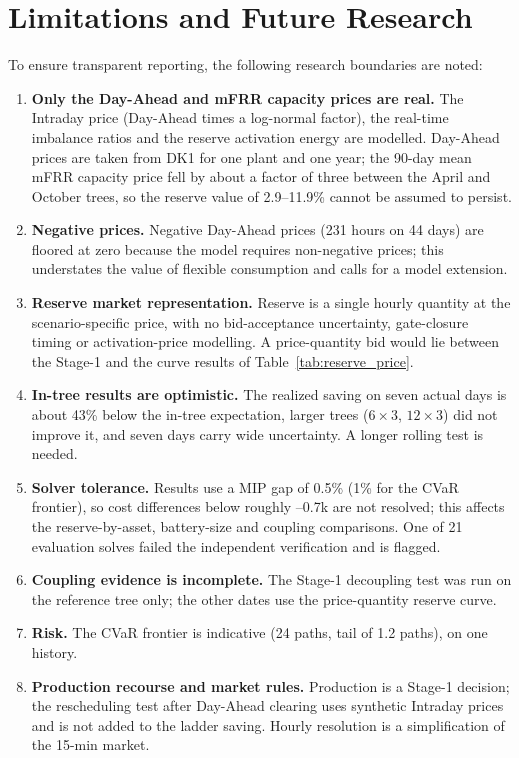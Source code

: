 \documentclass[journal]{IEEEtran}
\begin{document}
\section{Limitations and Future Research}
To ensure transparent reporting, the following research boundaries are noted:
\begin{enumerate}
    \item \textbf{Only the Day-Ahead and mFRR capacity prices are real.} The Intraday price (Day-Ahead times a log-normal factor), the real-time imbalance ratios and the reserve activation energy are modelled. Day-Ahead prices are taken from DK1 for one plant and one year; the 90-day mean mFRR capacity price fell by about a factor of three between the April and October trees, so the reserve value of 2.9--11.9\% cannot be assumed to persist.
    \item \textbf{Negative prices.} Negative Day-Ahead prices (231 hours on 44 days) are floored at zero because the model requires non-negative prices; this understates the value of flexible consumption and calls for a model extension.
    \item \textbf{Reserve market representation.} Reserve is a single hourly quantity at the scenario-specific price, with no bid-acceptance uncertainty, gate-closure timing or activation-price modelling. A price-quantity bid would lie between the Stage-1 and the curve results of Table~\ref{tab:reserve_price}.
    \item \textbf{In-tree results are optimistic.} The realized saving on seven actual days is about 43\% below the in-tree expectation, larger trees ($6\times3$, $12\times3$) did not improve it, and seven days carry wide uncertainty. A longer rolling test is needed.
    \item \textbf{Solver tolerance.} Results use a MIP gap of 0.5\% (1\% for the CVaR frontier), so cost differences below roughly --0.7k are not resolved; this affects the reserve-by-asset, battery-size and coupling comparisons. One of 21 evaluation solves failed the independent verification and is flagged.
    \item \textbf{Coupling evidence is incomplete.} The Stage-1 decoupling test was run on the reference tree only; the other dates use the price-quantity reserve curve.
    \item \textbf{Risk.} The CVaR frontier is indicative (24 paths, tail of 1.2 paths), on one history.
    \item \textbf{Production recourse and market rules.} Production is a Stage-1 decision; the rescheduling test after Day-Ahead clearing uses synthetic Intraday prices and is not added to the ladder saving. Hourly resolution is a simplification of the 15-min market.

\end{enumerate}
\end{document}
